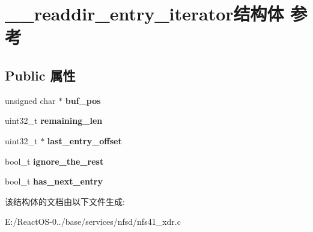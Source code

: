 \hypertarget{struct____readdir__entry__iterator}{}\section{\+\_\+\+\_\+readdir\+\_\+entry\+\_\+iterator结构体 参考}
\label{struct____readdir__entry__iterator}
\subsection*{Public 属性}
\begin{DoxyCompactItemize}
\item 
\mbox{\label{struct____readdir__entry__iterator_aecbb66b6b8785f2a14378a591881c9cf}} 
unsigned char $\ast$ {\bfseries buf\+\_\+pos}
\item 
\mbox{\label{struct____readdir__entry__iterator_a82958c563e81d34b9ff7a420f62ea994}} 
uint32\+\_\+t {\bfseries remaining\+\_\+len}
\item 
\mbox{\label{struct____readdir__entry__iterator_a945008e60629e8cff77b80ff14385b78}} 
uint32\+\_\+t $\ast$ {\bfseries last\+\_\+entry\+\_\+offset}
\item 
\mbox{\label{struct____readdir__entry__iterator_a1542322d87e201f30206b467891310da}} 
bool\+\_\+t {\bfseries ignore\+\_\+the\+\_\+rest}
\item 
\mbox{\label{struct____readdir__entry__iterator_aea055e3ccd7bae666e055a9302fa4157}} 
bool\+\_\+t {\bfseries has\+\_\+next\+\_\+entry}
\end{DoxyCompactItemize}


该结构体的文档由以下文件生成\+:\begin{DoxyCompactItemize}
\item 
E\+:/\+React\+O\+S-\/0../base/services/nfsd/nfs41\+\_\+xdr.\+c\end{DoxyCompactItemize}

